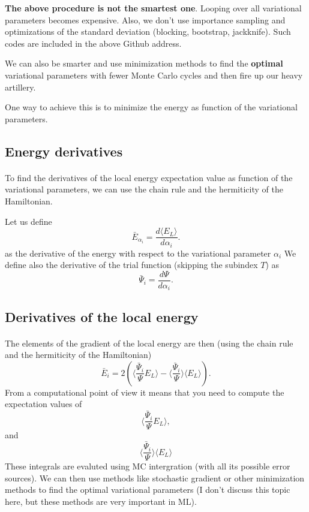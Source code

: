 \documentclass[%
oneside,                 %
final,                   %
10pt]{article}
\begin{document}
\textbf{The above procedure is not the smartest one}. Looping over all variational parameters becomes expensive.
Also, we don't use importance sampling and optimizations of the standard deviation (blocking, bootstrap, jackknife). 
Such codes are included in the above Github address.


We can also be smarter and use minimization methods to find the \textbf{optimal} variational parameters with fewer Monte Carlo cycles and then 
fire up our heavy artillery. 

One way to achieve this is to minimize the energy as function of the variational parameters.



\subsection{Energy derivatives}

\paragraph{}
To find the derivatives of the local energy expectation value as function of the variational parameters, we can use the chain rule and the hermiticity of the Hamiltonian.  

Let us define 
\[
\bar{E}_{\alpha_i}=\frac{d\langle  E_L\rangle}{d\alpha_i}.
\]
as the derivative of the energy with respect to the variational parameter $\alpha_i$
We define also the derivative of the trial function (skipping the subindex $T$) as 
\[
\bar{\Psi}_{i}=\frac{d\Psi}{d\alpha_i}.
\]




\subsection{Derivatives of the local energy}

\paragraph{}
The elements of the gradient of the local energy are then (using the chain rule and the hermiticity of the Hamiltonian)
\[
\bar{E}_{i}= 2\left( \langle \frac{\bar{\Psi}_{i}}{\Psi}E_L\rangle -\langle \frac{\bar{\Psi}_{i}}{\Psi}\rangle\langle E_L \rangle\right).
\]
From a computational point of view it means that you need to compute the expectation values of 
\[
\langle \frac{\bar{\Psi}_{i}}{\Psi}E_L\rangle,
\]
and
\[
\langle \frac{\bar{\Psi}_{i}}{\Psi}\rangle\langle E_L\rangle
\]
These integrals are evaluted using MC intergration (with all its possible error sources). 
We can then use methods like stochastic gradient or other minimization methods to find the optimal variational parameters (I don't discuss this topic here, but these methods are very important in ML).
\end{document}
